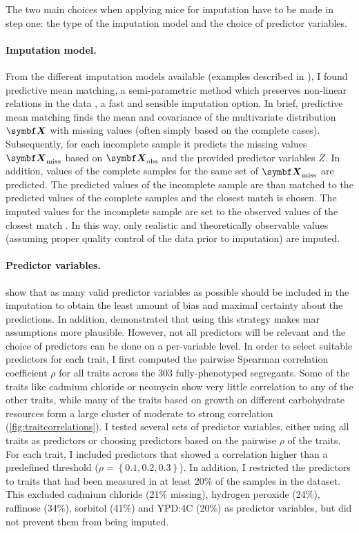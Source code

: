The two main choices when applying \gls{mice} for imputation have to be made in step one: the type of the imputation model and the choice of predictor variables. 

\paragraph{Imputation model.}From the different imputation models available (examples described in \citep{vanBuuren2011}), I found predictive mean matching, a semi-parametric method which preserves non-linear relations in the data \citep{Little1988,vanBuuren2011}, a fast and sensible imputation option.  In brief, predictive mean matching finds the mean and covariance of the multivariate distribution \(\mat{X}\) with missing values (often simply based on the complete cases). Subsequently, for each incomplete sample it predicts the missing values \(\mat{X}_\text{miss}\) based on \(\mat{X}_\text{obs}\) and the provided predictor variables \(Z\). In addition, values of the complete samples for the same set of \(\mat{X}_\text{miss}\) are predicted. The predicted values of the incomplete sample are than matched to the predicted values of the complete samples and the closest match is chosen. The imputed values for the incomplete sample are set to the observed values of the closest match \citep{Little1988}. In this way, only realistic and theoretically observable values (assuming proper quality control of the data prior to imputation) are imputed.

\paragraph{Predictor variables.} \citet{Collins2001} show that as many valid predictor variables as possible should be included in the imputation to obtain the least amount of bias and maximal certainty about the predictions. In addition,  \citet{Schafer1997} demonstrated that using this strategy makes \gls{mar} assumptions more plausible. However, not all predictors will be relevant and the choice of predictors can be done on a per-variable level. In order to select suitable predictors for each trait, I first computed the pairwise Spearman correlation coefficient \(\rho\) for all traits across the \num{303} fully-phenotyped segregants. Some of the traits like cadmium chloride or neomycin show very little correlation to any of the other traits, while many of the traits based on growth on different carbohydrate resources form a large cluster of moderate to strong correlation (\cref{fig:traitcorrelations}). 
I tested several sets of predictor variables, either using all traits as predictors or choosing predictors based on the pairwise \(\rho\) of the traits. For each trait, I included predictors that showed a correlation higher than a predefined threshold (\(\rho =\left\{0.1, 0.2, 0.3\right\}\)). In addition, I restricted the predictors to traits that had been measured in at least 20\% of the samples in the dataset. This excluded cadmium chloride  (21\% missing), hydrogen peroxide (24\%), raffinose (34\%), sorbitol (41\%) and YPD:4C (20\%) as predictor variables, but did not prevent them from being imputed.

